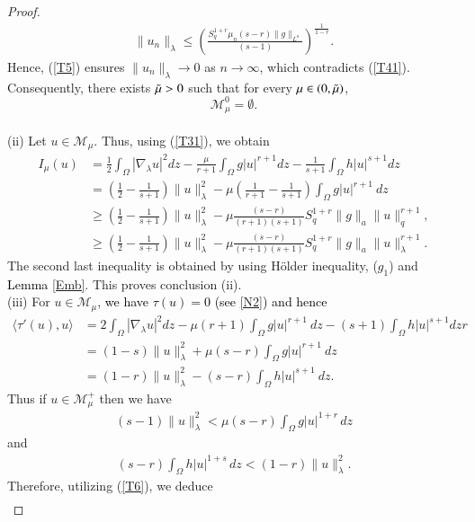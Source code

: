 \documentclass[12pt, notitlepage]{article}
\begin{document}
{\begin{proof}
\begin{align}\label{T5}
    \|u_n\|_\lambda\leq \left (\frac{S_q^{1+r}\mu_n(s-r)\|g\|_{L^a}}{(s-1)}\right )^\frac{1}{1-r}.
\end{align}
Hence, (\ref{T5}) ensures $\|u_n\|_\lambda\to 0$ as $n\to\infty$, which contradicts (\ref{T41}). Consequently, there exists $\Tilde{\mu}>0$ such that for every $\mu\in(0,\Tilde{\mu})$, $$\mathscr{M}^0_\mu=\emptyset.$$\\
(ii) Let $u\in\mathscr{M}_\mu$. Thus, using (\ref{T31}), we obtain 
\begin{align}
     I_\mu(u)&=\frac{1}{2}\int_\Omega |\nabla_\lambda u|^2 dz-\frac{\mu}{r+1}\int_\Omega g|u|^{r+1} dz-\frac{1}{s+1}\int_\Omega h|u|^{s+1} dz\nonumber\\
     &=\left (\frac{1}{2}-\frac{1}{s+1}\right )\|u\|^2_\lambda-\mu\left (\frac{1}{r+1}-\frac{1}{s+1}\right )\int_\Omega g|u|^{r+1}\ dz\label{RR}\\
     &\geq \left (\frac{1}{2}-\frac{1}{s+1}\right )\|u\|^2_\lambda-\mu\frac{(s-r)}{(r+1)(s+1)}S_q^{1+r}\|g\|_a\|u\|_q^{r+1},\nonumber\\
     &\geq \left (\frac{1}{2}-\frac{1}{s+1}\right )\|u\|^2_\lambda-\mu\frac{(s-r)}{(r+1)(s+1)}S_q^{1+r}\|g\|_a\|u\|_\lambda^{r+1}.\label{T8}
\end{align}
The second last inequality is obtained by using H\"{o}lder inequality, ($g_1$) and \textcolor{black}{Lemma \ref{Emb}}. This proves conclusion (ii).\\
(iii) For $u\in\mathscr{M}_\mu$, \textcolor{black}{we have $\tau(u)=0$ (see \eqref{N2}) and hence}
\begin{align}
    \langle \tau'(u),u\rangle&=2\int_\Omega |\nabla_\lambda u|^2 dz-\mu(r+1)\int_\Omega g|u|^{r+1}\ dz-(s+1)\int_\Omega h|u|^{s+1} dzr\nonumber\\
    &=(1-s)\|u\|_\lambda^2+\mu(s-r)\int_\Omega g|u|^{r+1}\ dz\label{TT9}\\
    &=(1-r)\|u\|_\lambda^2-(s-r)\int_\Omega h|u|^{s+1}\  dz.\label{TT6}
\end{align}
Thus if $u\in\mathscr{M}^+_\mu$ then we have 
\begin{align}\label{T9}
    (s-1)\|u\|_\lambda^2<\mu(s-r)\int_\Omega g|u|^{1+r}\, dz
\end{align}
and
\begin{align}\label{T6}
    (s-r)\int_\Omega h|u|^{1+s}\, dz<(1-r)\|u\|_\lambda^2.
\end{align}
Therefore, utilizing (\ref{T6}), we deduce
\begin{align}\label{SAN}

\end{align}
\end{proof}}
\end{document}
